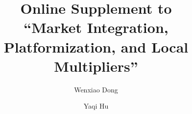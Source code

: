 \documentclass[11pt]{article}
\title{Online Supplement to\\
``Market Integration, Platformization, and Local Multipliers''}
\author{Wenxiao Dong \and Yaqi Hu}
\date{}
\begin{document}
\maketitle
\setcounter{figure}{0}
\renewcommand{\thefigure}{S\arabic{figure}}
\renewcommand{\theHfigure}{S.\arabic{figure}}

\end{document}
